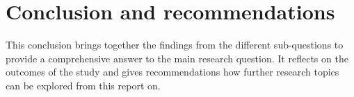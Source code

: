 \chapter{Conclusion and recommendations}
\label{chapter:conclusion}

This conclusion brings together the findings from the different sub-questions to provide a comprehensive answer to the main research question. It reflects on the outcomes of the study and gives recommendations how further research topics can be explored from this report on.





